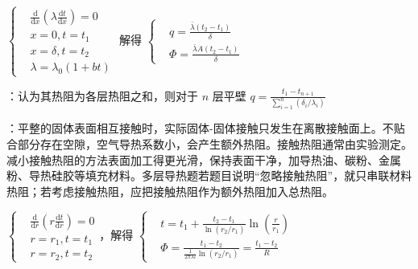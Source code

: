 
$\left\{
    \begin{aligned}
         & \frac{\mathrm{d}}{\mathrm{d}x}\left(\lambda \frac{\mathrm{d}t}{\mathrm{d}x}\right)= 0 \\
         & x=0,t=t_1                                                                             \\
         & x=\delta,t=t_2                                                                        \\
         & \lambda = \lambda_0(1+b t)
    \end{aligned}
    \right.$ 解得 $\left\{
    \begin{aligned}
         & q = \frac{\bar{\lambda}(t_2-t_1)}{\delta}     \\
         & \Phi = \frac{\bar{\lambda}A(t_2-t_1)}{\delta}
    \end{aligned}
    \right.$

：认为其热阻为各层热阻之和，则对于 $n$ 层平壁 $q = \frac{t_1-t_{n+1}}{\sum_{i=1}^n (\delta_i/\lambda_i)}$

：平整的固体表面相互接触时，实际固体-固体接触只发生在离散接触面上。不贴合部分存在空隙，空气导热系数小，会产生额外热阻。接触热阻通常由实验测定。减小接触热阻的方法表面加工得更光滑，保持表面干净，加导热油、碳粉、金属粉、导热硅胶等填充材料。多层导热题若题目说明“忽略接触热阻”，就只串联材料热阻；若考虑接触热阻，应把接触热阻作为额外热阻加入总热阻。

\divider



$\left\{
    \begin{aligned}
         & \frac{\mathrm{d}}{\mathrm{d}r}\left(r  \frac{\mathrm{d}t}{\mathrm{d}r}\right)=0 \\
         & r=r_1,t=t_1                                                                     \\
         & r=r_2,t=t_2
    \end{aligned}
    \right.$，解得 $\left\{
    \begin{aligned}
         & t = t_1 + \frac{t_2-t_1}{\ln(r_2/r_1)}\ln\left(\frac{r}{r_1}\right)        \\
         & \Phi=\frac{t_1-t_2}{\frac{1}{2\pi\lambda l}\ln(r_2/r_1)}=\frac{t_1-t_2}{R}
    \end{aligned}
    \right.$

